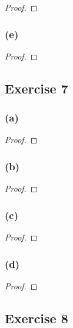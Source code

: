 \documentclass[14pt]{extarticle}
\begin{document}
\begin{proof}

\end{proof}

\subsubsection{(e)}

\begin{proof}

\end{proof}

\subsection{Exercise 7}

\subsubsection{(a)}

\begin{proof}

\end{proof}

\subsubsection{(b)}

\begin{proof}

\end{proof}

\subsubsection{(c)}

\begin{proof}

\end{proof}

\subsubsection{(d)}

\begin{proof}

\end{proof}

\subsection{Exercise 8}
\end{document}
